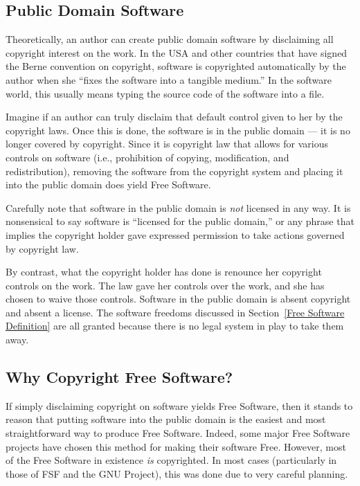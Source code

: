 \subsection{Public Domain Software}
Theoretically, an author can create public domain software by disclaiming all
copyright interest on the work. In the USA and other countries that have
signed the Berne convention on copyright, software is copyrighted
automatically by the author when she ``fixes the software into a tangible
medium.''  In the software world, this usually means typing the source code
of the software into a file.

Imagine if an author can truly disclaim that default control given to her by the
copyright laws. Once this is done, the software is in the public domain
--- it is no longer covered by copyright. Since it is copyright law that
allows for various controls on software (i.e., prohibition of copying,
modification, and redistribution), removing the software from the
copyright system and placing it into the public domain does yield Free
Software.

Carefully note that software in the public domain is \emph{not} licensed
in any way. It is nonsensical to say software is ``licensed for the
public domain,'' or any phrase that implies the copyright holder gave
expressed permission to take actions governed by copyright law.

By contrast, what the copyright holder has done is renounce her copyright
controls on the work. The law gave her controls over the work, and she
has chosen to waive those controls. Software in the public domain is
absent copyright and absent a license. The software freedoms discussed in
Section~\ref{Free Software Definition} are all granted because there is no
legal system in play to take them away.

\subsection{Why Copyright Free Software?}

If simply disclaiming copyright on software yields Free Software, then it
stands to reason that putting software into the public domain is the
easiest and most straightforward way to produce Free Software. Indeed,
some major Free Software projects have chosen this method for making their
software Free. However, most of the Free Software in existence \emph{is}
copyrighted. In most cases (particularly in those of FSF and the GNU
Project), this was done due to very careful planning.

